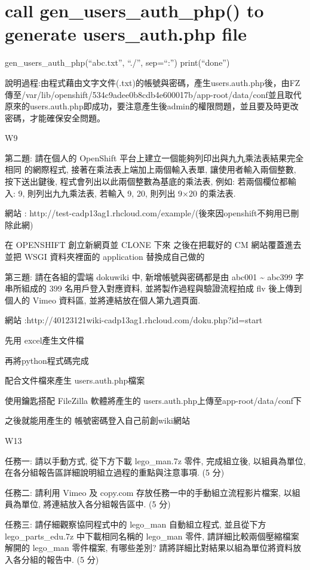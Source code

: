 \documentclass[]{article}
\begin{document}
\section{call gen\_users\_auth\_php() to generate users\_auth.php
file}\label{call-genux5fusersux5fauthux5fphp-to-generate-usersux5fauth.php-file}

gen\_users\_auth\_php(``abc.txt'', ``./'', sep=``:'') print(``done'')

說明過程:由程式藉由文字文件(.txt)的帳號與密碼，產生users.auth.php後，由FZ傳至/var/lib/openshift/534c9adee0b8cdb4e600017b/app-root/data/conf並且取代原來的users.auth.php即成功，要注意產生後admin的權限問題，並且要及時更改密碼，才能確保安全問題。

W9

第二題: 請在個人的 OpenShift
平台上建立一個能夠列印出與九九乘法表結果完全相同 的網際程式,
接著在乘法表上端加上兩個輸入表單, 讓使用者輸入兩個整數, 按下送出鍵後,
程式會列出以此兩個整數為基底的乘法表, 例如: 若兩個欄位都輸入: 9,
則列出九九乘法表, 若輸入 9, 20, 則列出 9×20 的乘法表.

網站 :
http://test-cadp13ag1.rhcloud.com/example/(後來因openshift不夠用已刪除此網)

在 OPENSHIFT 創立新網頁並 CLONE 下來 之後在把載好的 CM 網站覆蓋進去 並把
WSGI 資料夾裡面的 application 替換成自己做的

第三題: 請在各組的雲端 dokuwiki 中, 新增帳號與密碼都是由 abc001
\textasciitilde{} abc399 字串所組成的 399 名用戶登入對應資料,
並將製作過程與驗證流程拍成 flv 後上傳到個人的 Vimeo 資料區,
並將連結放在個人第九週頁面.

網站 :http://40123121wiki-cadp13ag1.rhcloud.com/doku.php?id=start

先用 excel產生文件檔

再將python程式碼完成

配合文件檔來產生 users.auth.php檔案

使用鑰匙搭配 FileZilla 軟體將產生的
users.auth.php上傳至app-root/data/conf下

之後就能用產生的 帳號密碼登入自己前創wiki網站

W13

任務一: 請以手動方式, 從下方下載 lego\_man.7z 零件, 完成組立後,
以組員為單位, 在各分組報告區詳細說明組立過程的重點與注意事項. (5 分)

任務二: 請利用 Vimeo 及 copy.com 存放任務一中的手動組立流程影片檔案,
以組員為單位, 將連結放入各分組報告區中. (5 分)

任務三: 請仔細觀察協同程式中的 lego\_man 自動組立程式, 並且從下方
lego\_parts\_edu.7z 中下載相同名稱的 lego\_man 零件,
請詳細比較兩個壓縮檔案解開的 lego\_man 零件檔案, 有哪些差別?
請將詳細比對結果以組為單位將資料放入各分組的報告中. (5 分)
\end{document}

